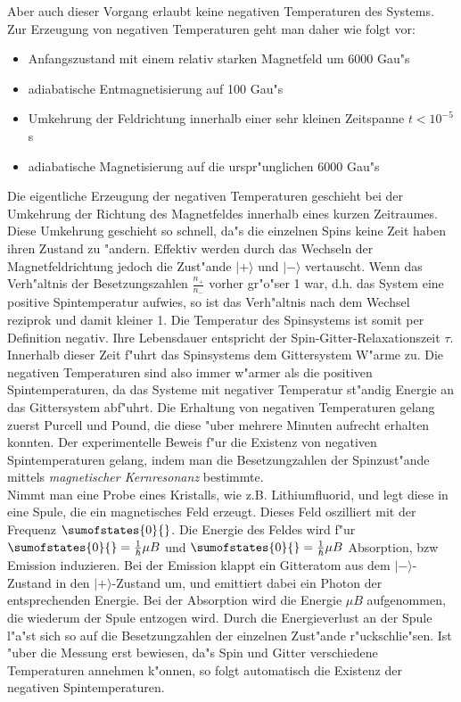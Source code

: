 \documentclass[12pt]{article}
\begin{document}
\begin{module}[id=mytemparature,uses=probability-intro]
Aber auch dieser Vorgang erlaubt keine negativen Temperaturen des Systems. 
Zur Erzeugung von negativen Temperaturen geht man daher wie folgt vor:
\begin{itemize}
\item Anfangszustand mit einem relativ starken Magnetfeld um 6000 Gau"s
\item adiabatische Entmagnetisierung auf 100 Gau"s
\item Umkehrung der Feldrichtung innerhalb einer sehr kleinen Zeitspanne 
$t < 10^{-5}$ s
\item adiabatische Magnetisierung auf die urspr"unglichen 6000 Gau"s
\end{itemize}
Die eigentliche Erzeugung der negativen Temperaturen geschieht bei der
Umkehrung der Richtung des Magnetfeldes innerhalb eines kurzen Zeitraumes. 
Diese Umkehrung geschieht so schnell, da"s die einzelnen Spins keine Zeit 
haben ihren Zustand zu "andern. Effektiv werden durch das Wechseln der 
Magnetfeldrichtung jedoch die Zust"ande $|+\rangle$ und $|-\rangle$ vertauscht. 
Wenn das Verh"altnis der Besetzungszahlen 
$\frac{n_{+}}{n_{-}}$ vorher gr"o"ser 1 war, d.h. das System eine positive 
Spintemperatur aufwies, so ist das Verh"altnis nach dem Wechsel reziprok und 
damit kleiner 1. Die Temperatur des Spinsystems ist somit per Definition 
negativ. Ihre Lebensdauer entspricht der Spin-Gitter-Relaxationszeit $\tau$.
Innerhalb dieser Zeit f"uhrt das Spinsystems dem Gittersystem W"arme zu. 
Die negativen Temperaturen sind also immer w"armer als die positiven 
Spintemperaturen, da das Systeme mit negativer Temperatur st"andig Energie 
an das Gittersystem abf"uhrt.
Die Erhaltung von negativen Temperaturen gelang zuerst Purcell und Pound, 
die diese "uber mehrere Minuten aufrecht erhalten konnten.
Der experimentelle Beweis f"ur die Existenz von negativen Spintemperaturen 
gelang, indem man die Besetzungzahlen der Spinzust"ande mittels 
{\em magnetischer Kernresonanz } bestimmte. \\
Nimmt man eine Probe eines Kristalls, wie z.B. Lithiumfluorid, und legt diese 
in eine Spule, die ein magnetisches Feld erzeugt. Dieses Feld oszilliert mit 
der Frequenz $\sumofstates{0}{}$. Die Energie des Feldes wird f"ur 
$\sumofstates{0}{}=\frac{1}{\hbar}\mu B$ und $\sumofstates{0}{}=\frac{1}{\hbar}\mu B$ 
Absorption, bzw Emission induzieren. Bei der Emission klappt ein Gitteratom 
aus dem $|-\rangle$-Zustand in den $|+\rangle$-Zustand um, und emittiert dabei ein Photon 
der entsprechenden Energie. Bei der Absorption wird die Energie $\mu B$ 
aufgenommen, die wiederum der Spule entzogen wird. Durch die Energieverlust 
an der Spule l"a"st sich so auf die Besetzungzahlen der einzelnen Zust"ande 
r"uckschlie"sen.
Ist "uber die Messung erst bewiesen, da"s Spin und Gitter verschiedene 
Temperaturen annehmen k"onnen, so folgt automatisch die Existenz der negativen 
Spintemperaturen.
\end{module}
\end{document}

